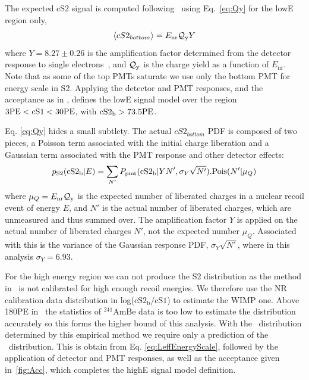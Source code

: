 The expected cS2 signal is computed following~\cite{DataMCXenon} using Eq.~\ref{eq:Qy} for the lowE region only,
%
\begin{equation}
\label{eq:Qy}
	\langle cS2_{bottom} \rangle = E_{\mathrm{nr}}\mathcal{Q}_{\mathrm{y}} Y   
\end{equation}
%
where $Y = 8.27 \pm 0.26$ 
is the amplification factor determined from the detector response to single electrons~\cite{XenonSingleElectron}, and $\mathcal{Q}_{\mathrm{y}}$ is the charge yield as a function of $E_\mathrm{nr}$. Note that as some of the top PMTs saturate we use only the bottom PMT for energy scale in S2. Applying the detector and PMT responses, and the acceptance as in \cite{xe100_run_combination}, defines the lowE signal model over the region $3 \mathrm{PE} < \mathrm{cS1} < 30 \mathrm{PE}$, with $\mathrm{cS2}_\mathrm{b} > 73.5 \mathrm{PE}$.

Eq. \ref{eq:Qy} hides a small subtlety. The actual $cS2_{bottom}$ PDF is composed of two pieces, a Poisson term associated with the initial charge liberation and a Gaussian term associated with the PMT response and other detector effects:
%
\begin{equation}
\label{eq.cS2pdf}
p_\mathrm{S2}(\mathrm{\mathrm{cS2}_\mathrm{b}}|E) = \sum_{N'} P_\mathrm{pmt}(\mathrm{\mathrm{cS2}_\mathrm{b}}|Y N',\sigma_Y \sqrt{N'}).\mathrm{Pois}(N'|\mu_Q)
\end{equation}
%
where $\mu_Q=E_{\mathrm{nr}}\mathcal{Q}_{\mathrm{y}}$ is the expected number of liberated charges in a nuclear recoil event of energy $E$, and $N'$ is the actual number of liberated charges, which are unmeasured and thus summed over. The amplification factor $Y$ is applied on the actual number of liberated charges $N'$, not the expected number $\mu_Q$. Associated with this is the variance of the Gaussian response PDF, $\sigma_Y\sqrt{N'}$, where in this analysis $\sigma_Y = 6.93$. 

For the high energy region we can not produce the S2 distribution as the method in~\cite{DataMCXenon} is not calibrated for high enough recoil energies. We therefore use the NR calibration data distribution in log($\mathrm{cS2_b/cS1}$) to estimate the WIMP one. Above 180PE in \cSi\ the statistics of $^{241}$AmBe data is too low to estimate the distribution accurately so this forms the higher bound of this analysis. With the \cSiib\ distribution determined by this empirical method we require only a prediction of the \cSi\ distribution. This is obtain from Eq. \ref{eq:LeffEnergyScale}, followed by the application of detector and PMT responses, as well as the acceptance given in~\ref{fig:Acc}, which completes the highE signal model definition.

